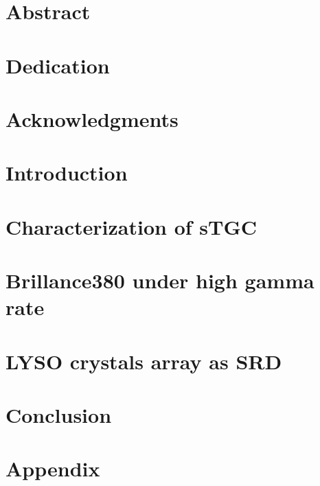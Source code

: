 \documentclass[12pt, a4letter,openright,twoside]{book}
\begin{document}





\chapter*{Abstract}



\chapter*{Dedication}


\chapter*{Acknowledgments}


\tableofcontents


\chapter{Introduction}



\chapter{Characterization of sTGC}



\chapter{Brillance380 under high gamma rate}



\chapter{LYSO crystals array as SRD}



\chapter{Conclusion}



\appendix
\chapter{Appendix}



\cleardoublepage


\end{document}
